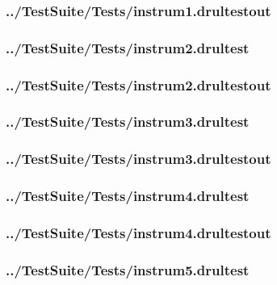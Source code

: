 \begin{changemargin}{-1in}{-1in}
\subsubsection{../TestSuite/Tests/instrum1.drultestout}


\subsubsection{../TestSuite/Tests/instrum2.drultest}


\subsubsection{../TestSuite/Tests/instrum2.drultestout}


\subsubsection{../TestSuite/Tests/instrum3.drultest}


\subsubsection{../TestSuite/Tests/instrum3.drultestout}


\subsubsection{../TestSuite/Tests/instrum4.drultest}


\subsubsection{../TestSuite/Tests/instrum4.drultestout}


\subsubsection{../TestSuite/Tests/instrum5.drultest}



\end{changemargin}

